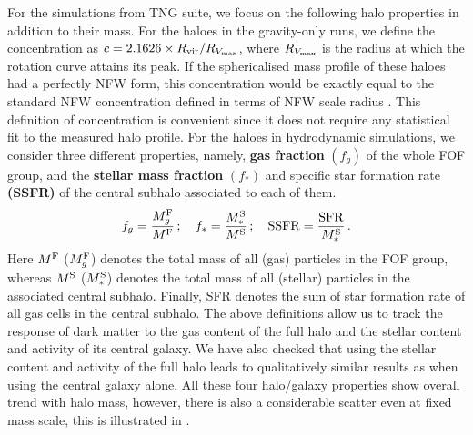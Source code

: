 For the simulations from TNG suite, we focus on the following halo properties in addition to their mass. For the haloes in the gravity-only runs, we define the concentration as $c=2.1626 \times R_{\rm vir}/R_{V_{\rm{max}}}$, where $R_{V_{\rm{max}}}$ is the radius at which the rotation curve attains its peak. If the sphericalised mass profile of these haloes had a perfectly NFW form, this concentration would be exactly equal to the standard NFW concentration defined in terms of NFW scale radius \citep[see equation 5 of ][]{1996ApJ...462..563N}. 
This definition of concentration is convenient since it does not require any statistical fit to the measured halo profile.
For the haloes in hydrodynamic simulations, we consider 
three different properties, namely, \textbf{gas fraction} $(f_g)$ of the whole FOF group, and the \textbf{stellar mass fraction} $(f_{\ast})$ and specific star formation rate \textbf{(SSFR)} of the central subhalo associated to each of them. 
\begin{align}
    f_{g} = \frac{M_{g}^{\rm{F}}}{M^{\rm{F}}}\,; \quad
    f_{\ast} = \frac{M_{\ast}^{\rm{S}}}{M^{\rm{S}}}\,; \quad {\rm SSFR} = \frac{\rm{SFR}}{M_{\ast}^{\rm{S}}}\,.
\label{eq:galpropdefs-ch:z0main}
\end{align}
Here $M^{\rm{F}}$ ($M_{g}^{\rm{F}}$) denotes the total mass of all (gas) particles in the FOF group, whereas $M^{\rm{S}}$ ($M_{\ast}^{\rm{S}}$) denotes the total mass of all (stellar) particles in the associated central subhalo. 
Finally, SFR denotes the sum of star formation rate of all gas cells in the central subhalo. The above definitions allow us to track the response of dark matter to the gas content of the full halo and the stellar content and activity of its central galaxy. We have also checked that using the stellar content and activity of the full halo leads to qualitatively similar results as when using the central galaxy alone. All these four halo/galaxy properties show overall trend with halo mass, however, there is also a considerable scatter even at fixed mass scale, this is illustrated in . 

